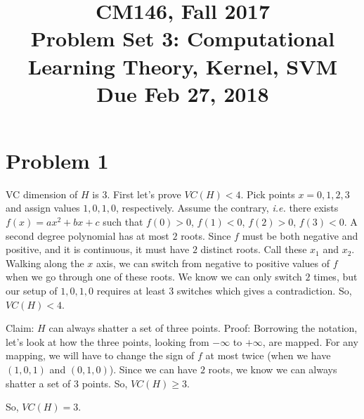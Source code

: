 \documentclass[11pt]{article}
\newcommand{\cnum}{CM146}
\newcommand{\ced}{Fall 2017}
\newcommand{\ctitle}[3]{\title{\vspace{-0.5in}\cnum, \ced\\Problem Set #1: #2\\Due #3}}
\newcommand{\solution}[1]{{{\color{blue}{\bf Solution:} {#1}}}}
\begin{document}
\ctitle{3}{Computational Learning Theory, Kernel, SVM}{Feb 27, 2018}
\author{}
\date{}
\maketitle
\vspace{-0.75in}

\section{Problem 1}
\solution{VC dimension of $H$ is 3. First let's prove $VC(H) < 4$. Pick points
  $x=0, 1, 2, 3$ and assign values $1, 0, 1, 0$, respectively. Assume the
  contrary, \textit{i.e.} there exists $f(x) = ax^2 + bx + c$ such that
  $f(0) > 0$, $f(1) < 0$, $f(2) > 0$, $f(3) < 0$. A second degree polynomial
  has at most $2$ roots. Since $f$ must be both negative and positive, and it
  is continuous, it must have $2$ distinct roots. Call these $x_1$ and $x_2$.
  Walking along the $x$ axis, we can switch from negative to positive values
  of $f$ when we go through one of these roots. We know we can only switch
  $2$ times, but our setup of $1, 0, 1, 0$ requires at least 3 switches which
  gives a contradiction. So, $VC(H) < 4$.

  Claim: $H$ can always shatter a set of three points. Proof: Borrowing the
  notation, let's look at how the three points, looking from $-\infty$ to
  $+\infty$, are mapped. For any mapping, we will have to change the sign
  of $f$ at most twice (when we have $(1, 0, 1)$ and $(0, 1, 0)$). Since we
  can have $2$ roots, we know we can always shatter a set of $3$ points. So,
  $VC(H) \geq 3$.

  So, $VC(H) = 3$.
}
\newpage
\end{document}
